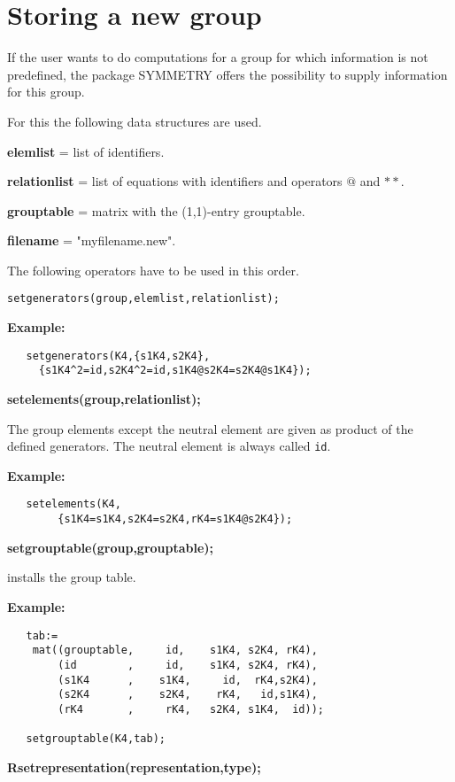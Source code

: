 \section{Storing a new group}

If the user wants to do computations for a group for which 
information is not predefined,
the package SYMMETRY offers the possibility to supply information
for this group.

For this the following data structures are used.

{\bf elemlist} = list of identifiers.

{\bf relationlist}  = list of equations with identifiers and
operators $@$ and $**$.

{\bf grouptable} = matrix with the (1,1)-entry grouptable.

{\bf filename} = "myfilename.new".

\vspace{2cm}
The following operators have to be used in this order.

{\tt setgenerators(group,elemlist,relationlist);}

{\bf Example:}
\begin{verbatim}
   setgenerators(K4,{s1K4,s2K4},
     {s1K4^2=id,s2K4^2=id,s1K4@s2K4=s2K4@s1K4});
\end{verbatim}

{\bf setelements(group,relationlist);}

The group elements except the neutral element 
are given as product of the defined
generators. The neutral element is always called {\tt id}.

{\bf Example:}
\begin{verbatim}
   setelements(K4,
        {s1K4=s1K4,s2K4=s2K4,rK4=s1K4@s2K4});
\end{verbatim}

{\bf setgrouptable(group,grouptable);}

installs the group table.

{\bf Example:}
\begin{verbatim}
   tab:=
    mat((grouptable,     id,    s1K4, s2K4, rK4),
        (id        ,     id,    s1K4, s2K4, rK4), 
        (s1K4      ,    s1K4,     id,  rK4,s2K4),
        (s2K4      ,    s2K4,    rK4,   id,s1K4),
        (rK4       ,     rK4,   s2K4, s1K4,  id));

   setgrouptable(K4,tab);
\end{verbatim}

{\bf Rsetrepresentation(representation,type);}


